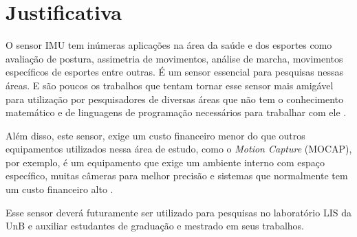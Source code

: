 \section{Justificativa}

O sensor IMU tem inúmeras aplicações na área da saúde e dos esportes como avaliação de postura, assimetria de movimentos, análise de marcha, movimentos específicos de esportes entre outras. É um sensor essencial para pesquisas nessas áreas. E são poucos os trabalhos que tentam tornar esse sensor mais amigável para utilização por pesquisadores de diversas áreas que não tem o conhecimento matemático e de linguagens de programação necessários para trabalhar com ele \cite{ober2015}\cite{chang2016}. 

Além disso, este sensor, exige um custo financeiro menor do que outros equipamentos utilizados nessa área de estudo, como o \textit{Motion Capture} (MOCAP), por exemplo, é um equipamento que exige um ambiente interno com espaço específico, muitas câmeras para melhor precisão e sistemas que normalmente tem um custo financeiro alto \cite{chang2016}. 

Esse sensor deverá futuramente ser utilizado para  pesquisas no laboratório LIS da UnB e auxiliar estudantes de graduação e mestrado em seus trabalhos.